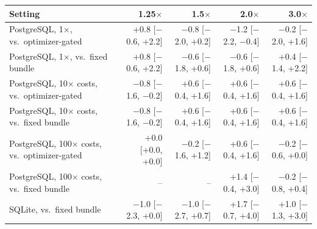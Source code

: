 \begin{tabular}{@{}lrrrr@{}}
\toprule
Setting & 1.25$\times$ & 1.5$\times$ & 2.0$\times$ & 3.0$\times$ \\
\midrule
PostgreSQL, 1$\times$, vs.\ optimizer-gated & +0.8 [$-$0.6, +2.2] & $-$0.8 [$-$2.0, +0.2] & $-$1.2 [$-$2.2, $-$0.4] & $-$0.2 [$-$2.0, +1.6] \\
PostgreSQL, 1$\times$, vs.\ fixed bundle & +0.8 [$-$0.6, +2.2] & $-$0.6 [$-$1.8, +0.6] & $-$0.6 [$-$1.8, +0.6] & +0.4 [$-$1.4, +2.2] \\
PostgreSQL, 10$\times$ costs, vs.\ optimizer-gated & $-$0.8 [$-$1.6, $-$0.2] & +0.6 [$-$0.4, +1.6] & +0.6 [$-$0.4, +1.6] & +0.6 [$-$0.4, +1.6] \\
PostgreSQL, 10$\times$ costs, vs.\ fixed bundle & $-$0.8 [$-$1.6, $-$0.2] & +0.6 [$-$0.4, +1.6] & +0.6 [$-$0.4, +1.6] & +0.6 [$-$0.4, +1.6] \\
PostgreSQL, 100$\times$ costs, vs.\ optimizer-gated & +0.0 [+0.0, +0.0] & $-$0.2 [$-$1.6, +1.2] & +0.6 [$-$0.4, +1.6] & $-$0.2 [$-$0.6, +0.0] \\
PostgreSQL, 100$\times$ costs, vs.\ fixed bundle & -- & -- & +1.4 [$-$0.4, +3.0] & $-$0.2 [$-$0.8, +0.4] \\
SQLite, vs.\ fixed bundle & $-$1.0 [$-$2.3, +0.0] & $-$1.0 [$-$2.7, +0.7] & +1.7 [$-$0.7, +4.0] & +1.0 [$-$1.3, +3.0] \\
\bottomrule
\end{tabular}